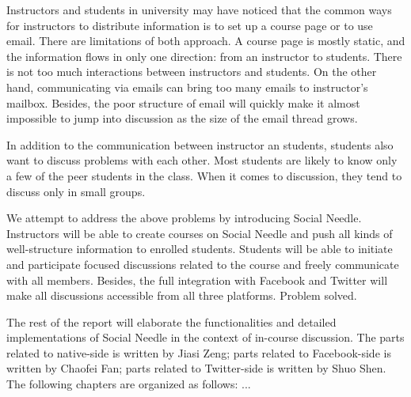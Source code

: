 Instructors and students in university may have noticed that the common ways for instructors to distribute information is to set up a course page or to use email. There are limitations of both approach. A course page is mostly static, and the information flows in only one direction: from an instructor to students. There is not too much interactions between instructors and students. On the other hand, communicating via emails can bring too many emails to instructor’s mailbox. Besides, the poor structure of email will quickly make it almost impossible to jump into discussion as the size of the email thread grows.

In addition to the communication between instructor an students, students also want to discuss problems with each other. Most students are likely to know only a few of the peer students in the class. When it comes to discussion, they tend to discuss only in small groups.

We attempt to address the above problems by introducing Social Needle. Instructors will be able to create courses on Social Needle and push all kinds of well-structure information to enrolled students. Students will be able to initiate and participate focused discussions related to the course and freely communicate with all members. Besides, the full integration with Facebook and Twitter will make all discussions accessible from all three platforms. Problem solved.   

The rest of the report will elaborate the functionalities and detailed implementations of Social Needle in the context of in-course discussion. The parts related to native-side is written by Jiasi Zeng; parts related to Facebook-side is written by Chaofei Fan; parts related to Twitter-side is written by Shuo Shen. The following chapters are organized as follows: ...
